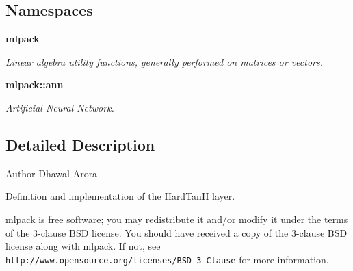 \subsection*{Namespaces}
\begin{DoxyCompactItemize}
\item 
 {\bf mlpack}
\begin{DoxyCompactList}\small\item\em Linear algebra utility functions, generally performed on matrices or vectors. \end{DoxyCompactList}\item 
 {\bf mlpack\+::ann}
\begin{DoxyCompactList}\small\item\em Artificial Neural Network. \end{DoxyCompactList}\end{DoxyCompactItemize}


\subsection{Detailed Description}
\begin{DoxyAuthor}{Author}
Dhawal Arora
\end{DoxyAuthor}
Definition and implementation of the Hard\+TanH layer.

mlpack is free software; you may redistribute it and/or modify it under the terms of the 3-\/clause B\+SD license. You should have received a copy of the 3-\/clause B\+SD license along with mlpack. If not, see {\tt http\+://www.\+opensource.\+org/licenses/\+B\+S\+D-\/3-\/\+Clause} for more information. 